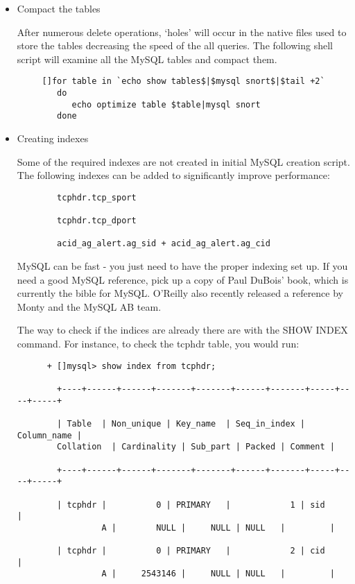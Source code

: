 \documentclass{article}
\begin{document}
\begin{itemize}
\item Compact the tables

    After numerous delete operations, `holes' will occur in the native files
    used to store the tables decreasing the speed of the all queries. The
    following shell script will examine all the MySQL tables and compact them.
      \begin{verbatim}
     []for table in `echo show tables$|$mysql snort$|$tail +2` 
        do 
           echo optimize table $table|mysql snort 
        done
	\end{verbatim}
\item Creating indexes

    Some of the required indexes are not created in initial MySQL creation
    script. The following indexes can be added to significantly improve
    performance:
\begin{verbatim}
        tcphdr.tcp_sport

        tcphdr.tcp_dport

        acid_ag_alert.ag_sid + acid_ag_alert.ag_cid
\end{verbatim}
    MySQL can be fast - you just need to have the proper indexing set up. If
    you need a good MySQL reference, pick up a copy of Paul DuBois' book, which
    is currently the bible for MySQL. O'Reilly also recently released a
    reference by Monty and the MySQL AB team.

    The way to check if the indices are already there are with the SHOW INDEX
    command. For instance, to check the tcphdr table, you would run:
    \begin{verbatim}
      + []mysql> show index from tcphdr;

        +----+------+------+-------+-------+------+-------+-----+----+-----+

        | Table  | Non_unique | Key_name  | Seq_in_index | Column_name |
        Collation  | Cardinality | Sub_part | Packed | Comment |

        +----+------+------+-------+-------+------+-------+-----+----+-----+

        | tcphdr |          0 | PRIMARY   |            1 | sid         |
                 A |        NULL |     NULL | NULL   |         |

        | tcphdr |          0 | PRIMARY   |            2 | cid         |
                 A |     2543146 |     NULL | NULL   |         |


\end{verbatim}
\end{itemize}
\end{document}
